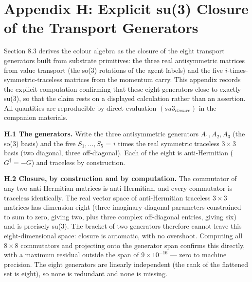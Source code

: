 \documentclass[11pt,oneside]{report}
\theoremstyle{definition}
\theoremstyle{remark}
\begin{document}
\section*{Appendix H: Explicit su(3) Closure of the Transport Generators}

Section 8.3 derives the colour algebra as the closure of the eight transport
generators built from substrate primitives: the three real antisymmetric
matrices from value transport (the so(3) rotations of the agent labels) and the
five \ensuremath{i}-times-symmetric-traceless matrices from the momentum carry. This
appendix records the explicit computation confirming that these eight generators
close to exactly su(3), so that the claim rests on a displayed calculation rather
than an assertion. All quantities are reproducible by direct evaluation
\ensuremath{(su3_{closure})} in the companion materials.

\textbf{H.1 The generators.} Write the three antisymmetric generators
\ensuremath{A_{1}, A_{2}, A_{3}} (the so(3) basis) and the five \ensuremath{S_{1},\dots,S_{5}} = \ensuremath{i} times the
real symmetric traceless \ensuremath{3\times 3} basis (two diagonal, three off-diagonal).
Each of the eight is anti-Hermitian (\ensuremath{G^{\dagger} = -G}) and traceless by
construction.

\textbf{H.2 Closure, by construction and by computation.} The commutator of any
two anti-Hermitian matrices is anti-Hermitian, and every commutator is traceless
identically. The real vector space of anti-Hermitian traceless \ensuremath{3\times 3}
matrices has dimension eight (three imaginary-diagonal parameters constrained to
sum to zero, giving two, plus three complex off-diagonal entries, giving six) and
is precisely su(3). The bracket of two generators therefore cannot leave this
eight-dimensional space: closure is automatic, with no overshoot. Computing all
\ensuremath{8\times 8} commutators and projecting onto the generator span confirms this
directly, with a maximum residual outside the span of \ensuremath{9\times 10^{-16}} --- zero to
machine precision. The eight generators are linearly independent (the rank of the
flattened set is eight), so none is redundant and none is missing.
\end{document}
